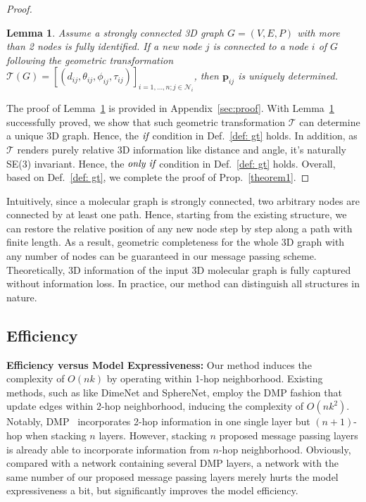 \documentclass{article}
\newtheorem{lemma}{Lemma}
\begin{document}
\begin{proof}
\begin{lemma}
Assume a strongly connected 3D graph $G=(V,E,P)$ with more than 2 nodes is fully identified.
If a new node $j$ is connected to a node $i$ of $G$ following the geometric transformation $\mathcal{T}(G)=[(d_{ij},\theta_{ij},\phi_{ij}, \tau_{ij})]_{i=1,...,n; j\in \mathcal{N}_i}$, then $\textbf{p}_{ij}$ is uniquely determined.
\label{lemma1}
\vspace{-5 pt}
\end{lemma}
The proof of Lemma~\ref{lemma1} is provided in Appendix~\ref{sec:proof}.
With Lemma~\ref{lemma1} successfully proved, we show that such geometric transformation $\mathcal{T}$
can determine a unique 3D graph.
Hence, the $\emph{if}$ condition in Def.~\ref{def: gt} holds.
In addition, as $\mathcal{T}$ renders purely relative 3D information like distance and angle, it's naturally 
SE(3) invariant. 
Hence, the $\emph{only if}$ condition in Def.~\ref{def: gt} holds.
Overall, based on Def.~\ref{def: gt}, we complete the proof of Prop.~\ref{theorem1}.
\vspace{-5 pt}
\end{proof}

Intuitively, since a molecular graph is strongly connected, two
arbitrary nodes are connected by at least one path. Hence, starting from the existing structure, we can restore the relative position of any new node step by step along a path with finite length.
As a result, geometric completeness for the whole 3D graph with any number of nodes can be guaranteed in our message passing scheme.
Theoretically, 3D information of the input 3D molecular graph
is fully captured without information loss.
In practice, our method can distinguish
all structures in nature.



\subsection{Efficiency}  \label{sec:effi}
\textbf{Efficiency versus Model Expressiveness:} Our method induces the complexity of $O(nk)$ by operating within 1-hop neighborhood.
Existing methods, such as like DimeNet and SphereNet, employ the DMP fashion that update edges
within 2-hop neighborhood, inducing the complexity of $O(nk^2)$.
Notably, DMP~\citep{stokes2020deep,yang2019analyzing,klicpera_dimenet_2020, liu2022spherical} incorporates
2-hop information in one single layer but $(n+1)$-hop when stacking $n$ layers.
However,
stacking $n$ proposed message passing layers is already able to incorporate information from $n$-hop neighborhood.
Obviously, compared with a network containing several DMP layers, a network with the same number of our
proposed message passing layers merely hurts the model expressiveness a bit, but
significantly improves the model efficiency.
\end{document}
